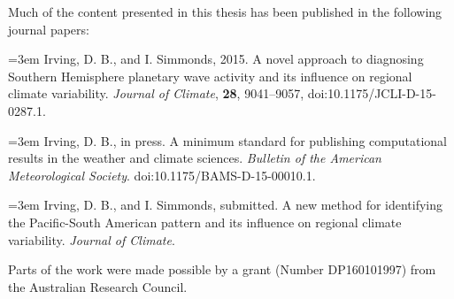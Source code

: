 
\begin{preface}

Much of the content presented in this thesis has been published in the following journal papers:

\vspace{5mm}
\hangindent=3em
Irving, D. B., and I. Simmonds, 2015. A novel approach to diagnosing Southern Hemisphere planetary wave activity and its influence on regional climate variability. \textit{Journal of Climate}, \textbf{28}, 9041--9057, doi:10.1175/JCLI-D-15-0287.1.

\vspace{5mm}
\hangindent=3em
Irving, D. B., in press. A minimum standard for publishing computational results in the weather and climate sciences. \textit{Bulletin of the American Meteorological Society}. doi:10.1175/BAMS-D-15-00010.1.

\vspace{5mm}
\hangindent=3em
Irving, D. B., and I. Simmonds, submitted. A new method for identifying the Pacific-South American pattern and its influence on regional climate variability. \textit{Journal of Climate}.

\vspace{5mm}
\noindent Parts of the work were made possible by a grant (Number DP160101997) from the Australian Research Council. 

\end{preface}

